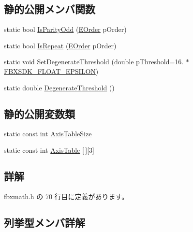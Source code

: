 \subsection*{静的公開メンバ関数}
\begin{DoxyCompactItemize}
\item 
static bool \hyperlink{class_fbx_euler_a7eabb69ba7eadc7b0b025eccee605648}{Is\+Parity\+Odd} (\hyperlink{class_fbx_euler_a7d5bec7eedb022b4dae56894ab7a9939}{E\+Order} p\+Order)
\item 
static bool \hyperlink{class_fbx_euler_a6f668dbfcefeee76a9668aafd3b53e45}{Is\+Repeat} (\hyperlink{class_fbx_euler_a7d5bec7eedb022b4dae56894ab7a9939}{E\+Order} p\+Order)
\item 
static void \hyperlink{class_fbx_euler_aea5f70a2534b0f5353a97aec02d9bafc}{Set\+Degenerate\+Threshold} (double p\+Threshold=16. $\ast$\hyperlink{fbxtypes_8h_a11f9f828046657bad7afc23f591f2052}{F\+B\+X\+S\+D\+K\+\_\+\+F\+L\+O\+A\+T\+\_\+\+E\+P\+S\+I\+L\+ON})
\item 
static double \hyperlink{class_fbx_euler_a4bc8faf22d9ab4ee1d6b45d3ab45d86a}{Degenerate\+Threshold} ()
\end{DoxyCompactItemize}
\subsection*{静的公開変数類}
\begin{DoxyCompactItemize}
\item 
static const int \hyperlink{class_fbx_euler_aa7c81e68be87ae5c26810eba96ede9ba}{Axis\+Table\+Size}
\item 
static const int \hyperlink{class_fbx_euler_aa75edcd96f3a7432c31b09869051635d}{Axis\+Table} \mbox{[}$\,$\mbox{]}\mbox{[}3\mbox{]}
\end{DoxyCompactItemize}


\subsection{詳解}


 fbxmath.\+h の 70 行目に定義があります。



\subsection{列挙型メンバ詳解}
\mbox{\label{class_fbx_euler_ad021726fa17836ca3efd353ebc538f1a}} 
